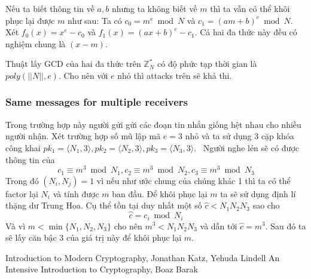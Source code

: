 \documentclass[12pt]{article}
\begin{document}
Nếu ta biết thông tin về $\displaystyle a,b$ nhưng ta không biết về $\displaystyle m$ thì ta vẫn có thể khôi phục lại được $\displaystyle m$ như sau: Ta có $\displaystyle c_{0} =m^{e}\bmod N$ và $\displaystyle c_{1} =( am+b)^{e}\bmod N$. Xét $\displaystyle f_{0}( x) =x^{e} -c_{0}$ và $\displaystyle f_{1}( x) =( ax+b)^{e} -c_{1}$. Cả hai đa thức này đều có nghiệm chung là $\displaystyle ( x-m)$. 

Thuật lấy GCD của hai đa thức trên $\displaystyle \mathbb{Z}_{N}^{*}$ có độ phức tạp thời gian là $\displaystyle poly( ||N||,e)$. Cho nên với $\displaystyle e$ nhỏ thì attacks trên sẽ khả thi. 

\subsubsection{Same messages for multiple receivers}


Trong trường hợp này người gửi gửi các đoạn tin nhắn giống hệt nhau cho nhiều người nhận. Xét trường hợp số mũ lập mã $\displaystyle e=3$ nhỏ và ta sử dụng 3 cặp khóa công khai $\displaystyle pk_{1} =\langle N_{1} ,3\rangle ,pk_{2} =\langle N_{2} ,3\rangle ,pk_{3} =\langle N_{3} ,3\rangle $. \ Người nghe lén sẽ có được thông tin của 
\begin{equation*}
c_{1} \equiv m^{3}\bmod N_{1} ,c_{2} \equiv m^{3}\bmod N_{2} ,c_{3} \equiv m^{3}\bmod N_{3}
\end{equation*}
Trong đó $\displaystyle ( N_{i} ,N_{j}) =1$ vì nếu như ước chung của chúng khác 1 thì ta có thể factor lại $\displaystyle N_{i}$ và tính được $\displaystyle m$ ban đầu. Để khôi phục lại $\displaystyle m$ ta sẽ sử dụng định lí thặng dư Trung Hoa. Cụ thể tồn tại duy nhất một số $\displaystyle \wideparen{c} < N_{1} N_{2} N_{3}$ sao cho 
\begin{equation*}
\wideparen{c} =c_{i}\bmod N_{i}
\end{equation*}
Và vì $\displaystyle m< \min\{N_{1} ,N_{2} ,N_{3}\}$ cho nên $\displaystyle m^{3} < N_{1} N_{2} N_{3}$ và dẫn tới $\displaystyle \wideparen{c} =m^{3}$. Sau đó ta sẽ lấy căn bậc 3 của giá trị này để khôi phục lại $\displaystyle m$. 




\begin{thebibliography}{99}
Introduction to Modern Cryptography, Jonathan Katz, Yehuda Lindell
An Intensive Introduction to Cryptography, Boaz Barak


\end{thebibliography}
\end{document}
